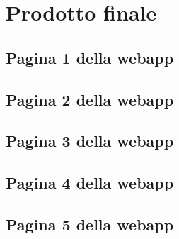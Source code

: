 \chapter{Prodotto finale}
\label{cap:prodotto-finale}

\section{Pagina 1 della webapp}


\section{Pagina 2 della webapp}


\section{Pagina 3 della webapp}


\section{Pagina 4 della webapp}


\section{Pagina 5 della webapp}
